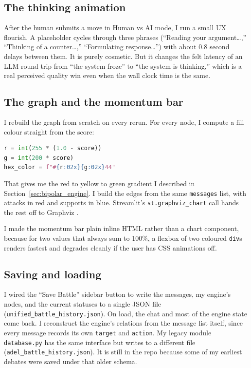 \subsection{The thinking animation}
After the human submits a move in Human vs AI mode, I run a small UX flourish. A placeholder cycles through three phrases (``Reading your argument\dots,'' ``Thinking of a counter\dots,'' ``Formulating response\dots'') with about 0.8 second delays between them. It is purely cosmetic. But it changes the felt latency of an LLM round trip from ``the system froze'' to ``the system is thinking,'' which is a real perceived quality win even when the wall clock time is the same.

\subsection{The graph and the momentum bar}
I rebuild the graph from scratch on every rerun. For every node, I compute a fill colour straight from the score:
\begin{lstlisting}[language=Python]
r = int(255 * (1.0 - score))
g = int(200 * score)
hex_color = f"#{r:02x}{g:02x}44"
\end{lstlisting}
That gives me the red to yellow to green gradient I described in Section~\ref{sec:bipolar_engine}. I build the edges from the same \texttt{messages} list, with attacks in red and supports in blue. Streamlit's \texttt{st.graphviz\_chart} call hands the rest off to Graphviz \cite{ellson2002graphviz}.

I made the momentum bar plain inline HTML rather than a chart component, because for two values that always sum to 100\%, a flexbox of two coloured \texttt{div}s renders fastest and degrades cleanly if the user has CSS animations off.

\subsection{Saving and loading}
I wired the ``Save Battle'' sidebar button to write the messages, my engine's nodes, and the current statuses to a single JSON file (\texttt{unified\_battle\_history.json}). On load, the chat and most of the engine state come back. I reconstruct the engine's relations from the message list itself, since every message records its own \texttt{target} and \texttt{action}. My legacy module \texttt{database.py} has the same interface but writes to a different file (\texttt{adel\_battle\_history.json}). It is still in the repo because some of my earliest debates were saved under that older schema.

